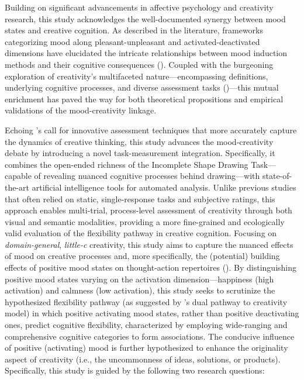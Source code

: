 \documentclass[../MA_Thesis.tex]{subfiles}
\begin{document}
Building on significant advancements in affective psychology and creativity research, this study acknowledges the well-documented synergy between mood states and creative cognition. As described in the literature, frameworks categorizing mood along pleasant-unpleasant and activated-deactivated dimensions have elucidated the intricate relationships between mood induction methods and their cognitive consequences (\cite{siedlecka_experimental_2019}). Coupled with the burgeoning exploration of creativity's multifaceted nature---encompassing definitions, underlying cognitive processes, and diverse assessment tasks (\cite{kaufman_cambridge_2010})---this mutual enrichment has paved the way for both theoretical propositions and empirical validations of the mood-creativity linkage.

Echoing \textcite{kaufman_cambridge_2010}’s call for innovative assessment techniques that more accurately capture the dynamics of creative thinking, this study advances the mood-creativity debate by introducing a novel task-measurement integration. Specifically, it combines the open-ended richness of the Incomplete Shape Drawing Task—capable of revealing nuanced cognitive processes behind drawing—with state-of-the-art artificial intelligence tools for automated analysis. Unlike previous studies that often relied on static, single-response tasks and subjective ratings, this approach enables multi-trial, process-level assessment of creativity through both visual and semantic modalities, providing a more fine-grained and ecologically valid evaluation of the flexibility pathway in creative cognition. Focusing on \textit{domain-general}, \textit{little-c} creativity, this study aims to capture the nuanced effects of mood on creative processes and, more specifically, the (potential) building effects of positive mood states on thought-action repertoires (\cite{fredrickson_role_2001}). By distinguishing positive mood states varying on the activation dimension---happiness (high activation) and calmness (low activation), this study seeks to scrutinize the hypothesized flexibility pathway (as suggested by \textcite{de_dreu_hedonic_2008}'s dual pathway to creativity model) in which positive activating mood states, rather than positive deactivating ones, predict cognitive flexibility, characterized by employing wide-ranging and comprehensive cognitive categories to form associations. The conducive influence of positive (activating) mood is further hypothesized to enhance the originality aspect of creativity (i.e., the uncommonness of ideas, solutions, or products). Specifically, this study is guided by the following two research questions:  
\end{document}
